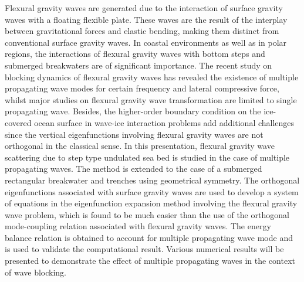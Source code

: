 \documentclass[9pt,a4paper,oneside]{book}
\numberwithin{equation}{section}
\begin{document}
Flexural gravity waves are generated due to the interaction of surface gravity waves with a floating flexible plate. These waves are the result of the interplay between gravitational forces and elastic bending, making them distinct from conventional surface gravity waves. In coastal environments as well as in polar regions, the interactions of flexural gravity waves with bottom steps and submerged breakwaters are of significant importance. The recent study on blocking dynamics of flexural gravity waves has revealed the existence of multiple propagating wave modes for certain frequency and lateral compressive force, whilst major studies on flexural gravity wave transformation are limited to single propagating wave. Besides, the higher-order boundary condition on the ice-covered ocean surface in wave-ice interaction problems add additional challenges since the vertical eigenfunctions involving flexural gravity waves are not orthogonal in the classical sense. In this presentation, flexural gravity wave scattering due to step type undulated sea bed is studied in the case of multiple propagating waves. The method is extended to the case of a submerged rectangular breakwater and trenches using geometrical symmetry. The orthogonal eigenfunctions associated with surface gravity waves are used to develop a system of equations in the eigenfunction expansion method involving the flexural gravity wave problem, which is found to be much easier than the use of the orthogonal mode-coupling relation associated with flexural gravity waves. The energy balance relation is obtained to account for multiple propagating wave mode and is used to validate the computational result. Various numerical results will be presented to demonstrate the effect of multiple propagating waves in the context of wave blocking.
\end{document}
